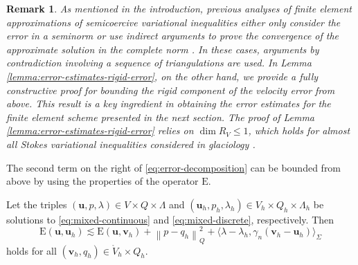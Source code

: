 \documentclass[onefignum,onetabnum]{siamart190516}
\newcommand{\bu}{\boldsymbol{u}}
\newcommand{\bv}{\boldsymbol{v}}
\newcommand{\bE}{\mathrm{E}}
\newcommand{\nrm}[1]{\left\lVert#1\right\rVert}
\newcommand{\Vo}{\mathring{V}}
\newtheorem{remark}[theorem]{Remark}
\begin{document}
\begin{remark}
	As mentioned in the introduction, previous analyses of finite element approximations of semicoercive variational inequalities either only consider the error in a seminorm \cite{hlavacek1978} or use indirect arguments to prove the convergence of the approximate solution in the complete norm \cite{bon1988, gwinner1991, spann1994, adly2000,chadli2018}. In these cases, arguments by contradiction involving a sequence of triangulations are used. In Lemma \ref{lemma:error-estimates-rigid-error}, on the other hand, we provide a fully constructive proof for bounding the rigid component of the velocity error from above. This result is a key ingredient in obtaining the error estimates for the finite element scheme presented in the next section. The proof of Lemma \ref{lemma:error-estimates-rigid-error} relies on $\dim{R_V} \leq 1$, which holds for almost all Stokes variational inequalities considered in glaciology \cite{durand2009, pattyn2012, favier2012, stubblefield2021, dediego2022}. 
\end{remark}


The second term on the right of \eqref{eq:error-decomposition} can be bounded from above by using the properties of the operator $\bE$.
	
	\begin{lemma}\label{lemma:error-Dv}
		Let the triples $(\bu,p,\lambda)\in V\times Q\times \Lambda$ and $(\bu_h,p_h,\lambda_h)\in V_h\times Q_h\times \Lambda_h$ be solutions to \eqref{eq:mixed-continuous} and \eqref{eq:mixed-discrete}, respectively. Then
		\begin{equation}\label{eq:error-Dv}
				\bE(\bu,\bu_h) \lesssim \bE(\bu,\bv_h) + \nrm{p - q_h}^2_Q  + \langle \lambda - \lambda_h, \gamma_n(\bv_h - \bu_h) \rangle_\Sigma
		\end{equation}
		holds for all $(\bv_h,q_h)\in \Vo_h\times Q_h$.
	\end{lemma}
	
\end{document}
